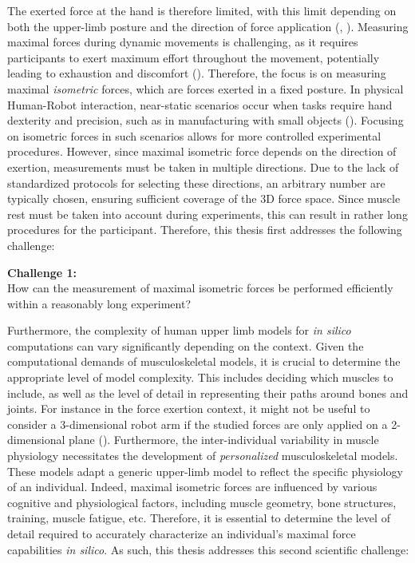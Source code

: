 The exerted force at the hand is therefore limited, with this limit depending on both the upper-limb posture and the direction of force application (\cite{oshimaRoboticAnalysesOutput2000}, \cite{hernandezIsometricForceCapabilities2015}). Measuring maximal forces during dynamic movements is challenging, as it requires participants to exert maximum effort throughout the movement, potentially leading to exhaustion and discomfort (\cite{roseFatigueRecoveryStatic2014}). Therefore, the focus is on measuring maximal \emph{isometric} forces, which are forces exerted in a fixed posture. In physical Human-Robot interaction, near-static scenarios occur when tasks require hand dexterity and precision, such as in manufacturing with small objects (\cite{javaidSignificantApplicationsCobots2022}). Focusing on isometric forces in such scenarios allows for more controlled experimental procedures. However, since maximal isometric force depends on the direction of exertion, measurements must be taken in multiple directions. Due to the lack of standardized protocols for selecting these directions, an arbitrary number are typically chosen, ensuring sufficient coverage of the 3D force space. Since muscle rest must be taken into account during experiments, this can result in rather long procedures for the participant. Therefore, this thesis first addresses the following challenge:

\begin{mdframed}
    \begin{center}
        \textbf{Challenge 1:} \\
        How can the measurement of maximal isometric forces be performed efficiently within a reasonably long experiment?
    \end{center}
\end{mdframed}

Furthermore, the complexity of human upper limb models for \emph{in silico} computations can vary significantly depending on the context. Given the computational demands of musculoskeletal models, it is crucial to determine the appropriate level of model complexity. This includes deciding which muscles to include, as well as the level of detail in representing their paths around bones and joints. For instance in the force exertion context, it might not be useful to consider a 3-dimensional robot arm if the studied forces are only applied on a 2-dimensional plane (\cite{sasakiHigherDimensionalSpatial2010a}). Furthermore, the inter-individual variability in muscle physiology necessitates the development of \emph{personalized} musculoskeletal models. These models adapt a generic upper-limb model to reflect the specific physiology of an individual. Indeed, maximal isometric forces are influenced by various cognitive and physiological factors, including muscle geometry, bone structures, training, muscle fatigue, etc. Therefore, it is essential to determine the level of detail required to accurately characterize an individual's maximal force capabilities \emph{in silico}. As such, this thesis addresses this second scientific challenge:

